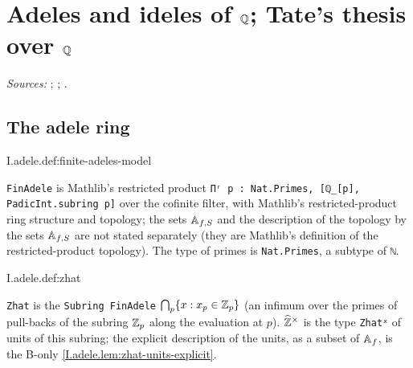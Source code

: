 \chapter{\texorpdfstring{Adeles and ideles of $\mathbb{Q}$; Tate's thesis over $\mathbb{Q}$}{Adeles and ideles of ℚ; Tate's thesis over ℚ}}\label{ch:ch-0-03-adeles}

\noindent\emph{Sources:} \cite{Corv-ptIII-1}; \cite{GH}; \cite[§2]{AIntro}.

\section{The adele ring}

\begin{definition}
\end{definition}
\begin{tfformal}{I.adele.def:finite-adeles-model}
\begin{tffidelity}
\texttt{FinAdele} is Mathlib's restricted product \texttt{Πʳ p : Nat.Primes, [ℚ\_[p], PadicInt.subring p]} over the cofinite filter, with Mathlib's restricted-product ring structure and topology; the sets $\mathbb{A}_{f,S}$ and the description of the topology by the sets $\mathbb{A}_{f,S}$ are not stated separately (they are Mathlib's definition of the restricted-product topology). The type of primes is \texttt{Nat.Primes}, a subtype of \texttt{ℕ}.
\end{tffidelity}
\end{tfformal}

\begin{definition}
\end{definition}
\begin{tfformal}{I.adele.def:zhat}
\begin{tffidelity}
\texttt{Zhat} is the \texttt{Subring FinAdele} $\bigcap_p\{x:x_p\in\mathbb{Z}_p\}$ (an infimum over the primes of pull-backs of the subring $\mathbb{Z}_p$ along the evaluation at $p$). $\widehat{\mathbb{Z}}^\times$ is the type \texttt{Zhatˣ} of units of this subring; the explicit description of the units, as a subset of $\mathbb{A}_f$, is the B-only \cref{I.adele.lem:zhat-units-explicit}.
\end{tffidelity}
\end{tfformal}

